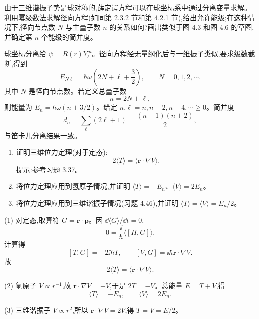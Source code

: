 \begin{question}
由于三维谐振子势是球对称的,薛定谔方程可以在球坐标系中通过分离变量求解。利用幂级数法求解径向方程(如同第 2.3.2 节和第 4.2.1 节),给出允许能级;在这种情况下,径向节点数 $N$ 与主量子数 $n$ 的关系如何?画出类似于图 4.3 和图 4.6 的草图,并确定第 $n$ 个能级的简并度。
\end{question}
\begin{solution}

球坐标分离给 $\psi=R(r)Y_\ell^m$。径向方程经无量纲化后与一维振子类似,要求级数截断,得到
\[
E_{N\ell}=\hbar\omega\left(2N+
\ell+\frac32\right),
\qquad N=0,1,2,\cdots.
\]
其中 $N$ 是径向节点数。若定义总量子数
\[
n=2N+\ell,
\]
则能量为 $E_n=\hbar\omega(n+3/2)$。给定 $n$,$\ell=n,n-2,n-4,\cdots\ge0$。简并度
\[
d_n=\sum_\ell(2\ell+1)=\frac{(n+1)(n+2)}{2},
\]
与笛卡儿分离结果一致。

\end{solution}

\begin{question}
\begin{enumerate}
\item 证明三维位力定理(对于定态):
\[
2\langle T\rangle=\langle \mathbf r\cdot\nabla V\rangle.
\]
提示:参考习题 3.37。
\item 将位力定理应用到氢原子情况,并证明 $\langle T\rangle=-E_n$、$\langle V\rangle=2E_n$。
\item 将位力定理应用到三维谐振子情况(习题 4.46),并证明 $\langle T\rangle=\langle V\rangle=E_n/2$。
\end{enumerate}
\end{question}
\begin{solution}

(1) 对定态,取算符 $G=\mathbf r\cdot\mathbf p$。因 $\dd\langle G\rangle/\dd t=0$,
\[
0=\frac{\ii}{\hbar}\langle[H,G]\rangle.
\]
计算得
\[
[T,G]=-2\ii\hbar T,
\qquad [V,G]=\ii\hbar\mathbf r\cdot\nabla V.
\]
故
\[
2\langle T\rangle=\langle\mathbf r\cdot\nabla V\rangle.
\]

(2) 氢原子 $V\propto r^{-1}$,故 $\mathbf r\cdot\nabla V=-V$,于是 $2T=-V$。总能量 $E=T+V$,得
\[
\langle T\rangle=-E_n,
\qquad \langle V\rangle=2E_n.
\]

(3) 三维谐振子 $V\propto r^2$,所以 $\mathbf r\cdot\nabla V=2V$,得 $T=V=E/2$。

\end{solution}


